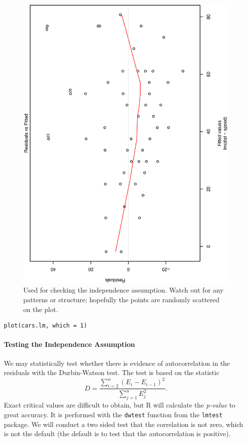 \documentclass[captions=tableheading]{scrbook}
\begin{document}
\begin{figure}[th]
  \includegraphics[angle=270, totalheight=4in]{img/resids-fitted-cars.ps}
  \caption[Plot of the residuals versus the fitted values for the \texttt{cars}
data]{\small Used for checking the independence assumption. Watch out for any patterns or structure; hopefully the points are randomly scattered on the plot.}
  \label{fig:resids-fitted-cars}
\end{figure}


\begin{verbatim}
plot(cars.lm, which = 1)
\end{verbatim}

\paragraph*{Testing the Independence Assumption}

We may statistically test whether there is evidence of autocorrelation in the residuals with the Durbin-Watson test. The test is based on the statistic
\begin{equation}
D=\frac{\sum_{i=2}^{n}(E_{i}-E_{i-1})^{2}}{\sum_{j=1}^{n}E_{j}^{2}}.
\end{equation}
Exact critical values are difficult to obtain, but \textsf{R} will calculate the \emph{p-value} to great accuracy. It is performed with the \texttt{dwtest} function from the \texttt{lmtest} package. We will conduct a two sided test that the correlation is not zero, which is not the default (the default is to test that the autocorrelation is positive).
\end{document}
